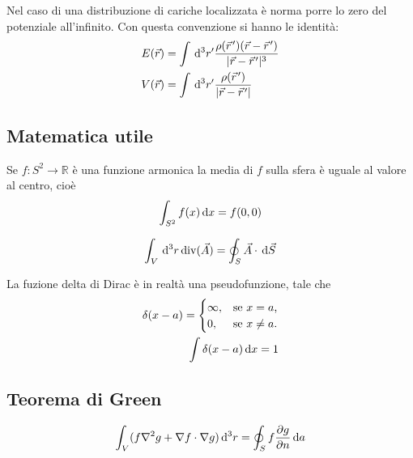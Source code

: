 \documentclass[../main.tex]{subfiles}
\begin{document}
Nel caso di una distribuzione di cariche localizzata è norma porre lo zero del potenziale all'infinito. 
Con questa convenzione si hanno le identità:
\begin{align}
	E(\vec r)&=\int \de^3 r' \frac{\rho(\pvec r')(\vec r-\pvec r')}{\abs{\vec{r}-\pvec r'}^3}\\
	V(\vec{r})&=\int \de^3 r' \frac{\rho(\pvec r')}{\abs{\vec{r}-\pvec r'}}\label{PotenzialeLocalizzato}
\end{align}



\subsection{Matematica utile}\label{Matematica}
\begin{theorem}
  \label{ThMedia}
  Se $f:S^2 \to \mathbb{R}$ \`e una funzione armonica la media di $f$ sulla sfera è uguale al valore al centro, cioè
  \begin{equation}
    \int_{S^2} f(x) \,\mathrm d x = f(0,0)
  \end{equation}
\end{theorem}

\begin{theorem}
  \label{ThDivergenza}
  \begin{equation}
    \int_V \,\mathrm d^3 r \operatorname{div}(\vec A) = \oint_S \vec A \cdot \,\mathrm d \vec S
  \end{equation}
\end{theorem}

\begin{definition}
La fuzione delta di Dirac è in realtà una pseudofunzione, tale che
  \begin{subequations}
    \label{DeltaDirac}
    \begin{align}
      \delta(x-a)=
      \begin{cases}
	\infty,	& \text{se $x=a$,} \\
	0, 	& \text{se $x \neq a$.}
      \end{cases}\\
      \int \delta (x-a) \,\mathrm d x =1
    \end{align}
  \end{subequations}
\end{definition}


\subsection{Teorema di Green}\label{Green}
\begin{theorem}
  \label{Green1}
  \begin{equation}
  \int_V (f \nabla^2 g + \nabla f \cdot \nabla g) \,\mathrm d^3 r = \oint_S f \frac{\partial g}{\partial n} \,\mathrm d a
  \end{equation}
\end{theorem}
\end{document}
